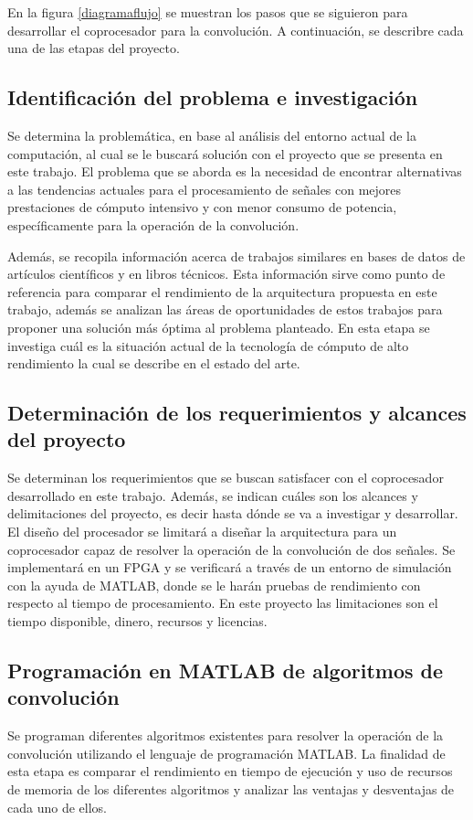 \newpage
En la figura \ref{diagramaflujo} se muestran los pasos que se siguieron para desarrollar el coprocesador para la convolución. A continuación, se describre cada una de las etapas del proyecto.

\subsection{Identificación del problema e investigación}
Se determina la problemática, en base al análisis del entorno actual de la computación, al cual se le buscará solución con el proyecto que se presenta en este trabajo. El problema que se aborda es la necesidad de encontrar alternativas a las tendencias actuales para el procesamiento de señales con mejores prestaciones de cómputo intensivo y con menor consumo de potencia, específicamente para la operación de la convolución.

Además, se recopila información acerca de trabajos similares en bases de datos de artículos científicos y en libros técnicos. Esta información sirve como punto de referencia para comparar el rendimiento de la arquitectura propuesta en este trabajo, además se analizan las áreas de oportunidades de estos trabajos para proponer una solución más óptima al problema planteado. En esta etapa se investiga cuál es la situación actual de la tecnología de cómputo de alto rendimiento la cual se describe en el estado del arte.

\subsection{Determinación de los requerimientos y alcances del proyecto}
Se determinan los requerimientos que se buscan satisfacer con el coprocesador desarrollado en este trabajo. Además, se indican cuáles son los alcances y delimitaciones del proyecto, es decir hasta dónde se va a investigar y desarrollar. El diseño del procesador se limitará a diseñar  la arquitectura para un coprocesador capaz de resolver la operación de la convolución de dos señales. Se implementará en un FPGA y se verificará a través de un entorno de simulación con la ayuda de MATLAB, donde se le harán pruebas de rendimiento con respecto al tiempo de procesamiento. En este proyecto las limitaciones son el tiempo disponible, dinero, recursos y licencias.

\subsection{Programación en MATLAB de algoritmos de convolución}
Se programan diferentes algoritmos existentes para resolver la operación de la convolución utilizando el lenguaje de programación MATLAB. La finalidad de esta etapa es comparar el rendimiento en tiempo de ejecución y uso de recursos de memoria de los diferentes algoritmos y analizar las ventajas y desventajas de cada uno de ellos. 

